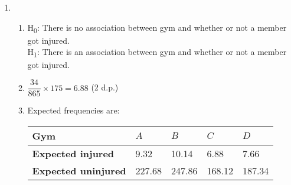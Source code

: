 \documentclass[fleqn]{article}
\begin{document}
\begin{enumerate}
    \newpage
    \item \begin{enumerate}[label=\bfseries \alph*\space ]
            \item H\textsubscript{0}: There is no association between gym and whether or not a member got injured. \\
                H\textsubscript{1}: There is an association between gym and whether or not a member got injured.
            
            \item $\dfrac{34}{865} \times 175=6.88$ (2 d.p.) \vspace{1mm}
            \item Expected frequencies are: \vspace{1mm}\\
                \begin{tabularx}{0.55\textwidth}{|X|*4{P{12mm}|}}
                    \hline
                    \textbf{Gym}                & $A$    & $B$    & $C$    & $D$     \\\hline
                    \textbf{Expected injured}   & 9.32   & 10.14  & 6.88   & 7.66    \\\hline
                    \textbf{Expected uninjured} & 227.68 & 247.86 & 168.12 & 187.34  \\\hline
                \end{tabularx}\vspace{4mm}
                

\end{enumerate}
\end{enumerate}
\end{document}
